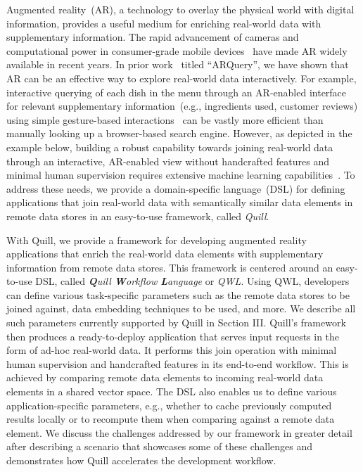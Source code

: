 \documentclass[11pt]{article}
\begin{document}
Augmented reality~(AR), a technology to overlay the physical world with digital information, provides a useful medium for enriching real-world data with supplementary information. The rapid advancement of cameras and computational power in consumer-grade mobile devices~\cite{azuma2001recent} have made AR widely available in recent years. In prior work~\cite{burley2019arquery} titled ``ARQuery'', we have shown that AR can be an effective way to explore real-world data interactively. For example, interactive querying of each dish in the menu through an AR-enabled interface for relevant supplementary information~(e.g., ingredients used, customer reviews) using simple gesture-based interactions~\cite{nandi2013gestural} can be vastly more efficient than manually looking up a browser-based search engine. However, as depicted in the example below, building a robust capability towards joining real-world data through an interactive, AR-enabled view without handcrafted features and minimal human supervision requires extensive machine learning capabilities~\cite{fernandez2018seeping}.
To address these needs, we provide a domain-specific language~(DSL) for defining applications that join real-world data with semantically similar data elements in remote data stores in an easy-to-use framework, called \textit{Quill}.

With Quill, we provide a framework for developing augmented reality applications that enrich the real-world data elements with supplementary information from remote data stores. This framework is centered around an easy-to-use DSL, called \textit{\textbf{Q}uill \textbf{W}orkflow \textbf{L}anguage} or \textit{QWL}. Using QWL, developers can define various task-specific parameters such as the remote data stores to be joined against, data embedding techniques to be used, and more. We describe all such parameters currently supported by Quill in Section III. Quill's framework then produces a ready-to-deploy application that serves input requests in the form of ad-hoc real-world data. It performs this join operation with minimal human supervision and handcrafted features in its end-to-end workflow. This is achieved by comparing remote data elements to incoming real-world data elements in a shared vector space. The DSL also enables us to define various application-specific parameters, e.g., whether to cache previously computed results locally or to recompute them when comparing against a remote data element. We discuss the challenges addressed by our framework in greater detail after describing a scenario that showcases some of these challenges and demonstrates how {Quill} accelerates the development workflow.\vspace{0.05cm}
\end{document}
